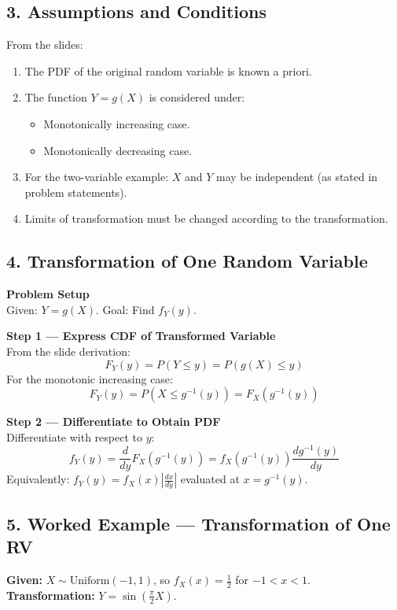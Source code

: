 \documentclass[11pt]{article}
\begin{document}
\subsection*{3. Assumptions and Conditions}
From the slides:
\begin{enumerate}
    \item The PDF of the original random variable is known a priori.
    \item The function $Y = g(X)$ is considered under:
    \begin{itemize}
        \item Monotonically increasing case.
        \item Monotonically decreasing case.
    \end{itemize}
    \item For the two-variable example: $X$ and $Y$ may be independent (as stated in problem statements).
    \item Limits of transformation must be changed according to the transformation.
\end{enumerate}

\subsection*{4. Transformation of One Random Variable}
\textbf{Problem Setup} \\
Given: $Y = g(X)$. Goal: Find $f_Y(y)$.

\textbf{Step 1 --- Express CDF of Transformed Variable} \\
From the slide derivation:
\begin{equation}
    F_Y(y) = P(Y \leq y) = P(g(X) \leq y)
\end{equation}
For the monotonic increasing case:
\begin{equation}
    F_Y(y) = P(X \leq g^{-1}(y)) = F_X(g^{-1}(y))
\end{equation}

\textbf{Step 2 --- Differentiate to Obtain PDF} \\
Differentiate with respect to $y$:
\begin{equation}
    f_Y(y) = \frac{d}{dy} F_X(g^{-1}(y)) = f_X(g^{-1}(y)) \frac{dg^{-1}(y)}{dy}
\end{equation}
Equivalently: $f_Y(y) = f_X(x) \left| \frac{dx}{dy} \right|$ evaluated at $x = g^{-1}(y)$.

\subsection*{5. Worked Example --- Transformation of One RV}
\textbf{Given:} $X \sim \text{Uniform}(-1, 1)$, so $f_X(x) = \frac{1}{2}$ for $-1 < x < 1$. \\
\textbf{Transformation:} $Y = \sin(\frac{\pi}{2}X)$.
\end{document}
